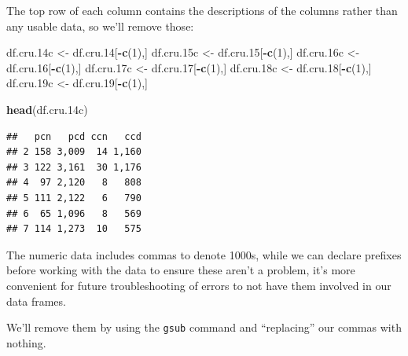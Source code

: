 \documentclass[
  11,
]{book}
\newenvironment{Shaded}{\begin{snugshade}}{\end{snugshade}}
\newcommand{\DecValTok}[1]{\textcolor[rgb]{0.06,0.06,0.06}{#1}}
\newcommand{\FloatTok}[1]{\textcolor[rgb]{0.06,0.06,0.06}{#1}}
\newcommand{\FunctionTok}[1]{\textcolor[rgb]{0.27,0.27,0.27}{\textbf{#1}}}
\newcommand{\NormalTok}[1]{#1}
\newcommand{\OtherTok}[1]{\textcolor[rgb]{0.37,0.37,0.37}{#1}}
\newcommand{\SpecialCharTok}[1]{\textcolor[rgb]{0.43,0.43,0.43}{\textbf{#1}}}
\begin{document}
The top row of each column contains the descriptions of the columns rather than any usable data, so we'll remove those:

\begin{Shaded}
\begin{Highlighting}[]
\NormalTok{df.cru}\FloatTok{.14}\NormalTok{c }\OtherTok{\textless{}{-}}\NormalTok{ df.cru}\FloatTok{.14}\NormalTok{[}\SpecialCharTok{{-}}\FunctionTok{c}\NormalTok{(}\DecValTok{1}\NormalTok{),]}
\NormalTok{df.cru}\FloatTok{.15}\NormalTok{c }\OtherTok{\textless{}{-}}\NormalTok{ df.cru}\FloatTok{.15}\NormalTok{[}\SpecialCharTok{{-}}\FunctionTok{c}\NormalTok{(}\DecValTok{1}\NormalTok{),]}
\NormalTok{df.cru}\FloatTok{.16}\NormalTok{c }\OtherTok{\textless{}{-}}\NormalTok{ df.cru}\FloatTok{.16}\NormalTok{[}\SpecialCharTok{{-}}\FunctionTok{c}\NormalTok{(}\DecValTok{1}\NormalTok{),]}
\NormalTok{df.cru}\FloatTok{.17}\NormalTok{c }\OtherTok{\textless{}{-}}\NormalTok{ df.cru}\FloatTok{.17}\NormalTok{[}\SpecialCharTok{{-}}\FunctionTok{c}\NormalTok{(}\DecValTok{1}\NormalTok{),]}
\NormalTok{df.cru}\FloatTok{.18}\NormalTok{c }\OtherTok{\textless{}{-}}\NormalTok{ df.cru}\FloatTok{.18}\NormalTok{[}\SpecialCharTok{{-}}\FunctionTok{c}\NormalTok{(}\DecValTok{1}\NormalTok{),]}
\NormalTok{df.cru}\FloatTok{.19}\NormalTok{c }\OtherTok{\textless{}{-}}\NormalTok{ df.cru}\FloatTok{.19}\NormalTok{[}\SpecialCharTok{{-}}\FunctionTok{c}\NormalTok{(}\DecValTok{1}\NormalTok{),]}

\FunctionTok{head}\NormalTok{(df.cru}\FloatTok{.14}\NormalTok{c)}
\end{Highlighting}
\end{Shaded}

\begin{verbatim}
##   pcn   pcd ccn   ccd
## 2 158 3,009  14 1,160
## 3 122 3,161  30 1,176
## 4  97 2,120   8   808
## 5 111 2,122   6   790
## 6  65 1,096   8   569
## 7 114 1,273  10   575
\end{verbatim}

The numeric data includes commas to denote 1000s, while we can declare prefixes before working with the data to ensure these aren't a problem, it's more convenient for future troubleshooting of errors to not have them involved in our data frames.

We'll remove them by using the \texttt{gsub} command and ``replacing'' our commas with nothing.
\end{document}
